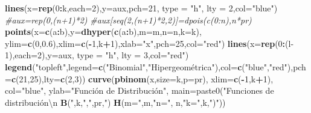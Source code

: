 \documentclass[]{book}
\newenvironment{Shaded}{\begin{snugshade}}{\end{snugshade}}
\newcommand{\CommentTok}[1]{\textcolor[rgb]{0.56,0.35,0.01}{\textit{#1}}}
\newcommand{\DataTypeTok}[1]{\textcolor[rgb]{0.13,0.29,0.53}{#1}}
\newcommand{\DecValTok}[1]{\textcolor[rgb]{0.00,0.00,0.81}{#1}}
\newcommand{\FloatTok}[1]{\textcolor[rgb]{0.00,0.00,0.81}{#1}}
\newcommand{\KeywordTok}[1]{\textcolor[rgb]{0.13,0.29,0.53}{\textbf{#1}}}
\newcommand{\NormalTok}[1]{#1}
\newcommand{\OperatorTok}[1]{\textcolor[rgb]{0.81,0.36,0.00}{\textbf{#1}}}
\newcommand{\StringTok}[1]{\textcolor[rgb]{0.31,0.60,0.02}{#1}}
\begin{document}
\begin{Shaded}
\begin{Highlighting}[]
  \KeywordTok{lines}\NormalTok{(}\DataTypeTok{x=}\KeywordTok{rep}\NormalTok{(}\DecValTok{0}\OperatorTok{:}\NormalTok{k,}\DataTypeTok{each=}\DecValTok{2}\NormalTok{),}\DataTypeTok{y=}\NormalTok{aux,}\DataTypeTok{pch=}\DecValTok{21}\NormalTok{, }\DataTypeTok{type =} \StringTok{"h"}\NormalTok{, }\DataTypeTok{lty =} \DecValTok{2}\NormalTok{,}\DataTypeTok{col=}\StringTok{"blue"}\NormalTok{)}
  \CommentTok{#aux=rep(0,(n+1)*2)}
  \CommentTok{#aux[seq(2,(n+1)*2,2)]=dpois(c(0:n),n*pr)}
  \KeywordTok{points}\NormalTok{(}\DataTypeTok{x=}\KeywordTok{c}\NormalTok{(a}\OperatorTok{:}\NormalTok{b),}\DataTypeTok{y=}\KeywordTok{dhyper}\NormalTok{(}\KeywordTok{c}\NormalTok{(a}\OperatorTok{:}\NormalTok{b),}\DataTypeTok{m=}\NormalTok{m,}\DataTypeTok{n=}\NormalTok{n,}\DataTypeTok{k=}\NormalTok{k),}
         \DataTypeTok{ylim=}\KeywordTok{c}\NormalTok{(}\DecValTok{0}\NormalTok{,}\FloatTok{0.6}\NormalTok{),}\DataTypeTok{xlim=}\KeywordTok{c}\NormalTok{(}\OperatorTok{-}\DecValTok{1}\NormalTok{,k}\OperatorTok{+}\DecValTok{1}\NormalTok{),}\DataTypeTok{xlab=}\StringTok{"x"}\NormalTok{,}\DataTypeTok{pch=}\DecValTok{25}\NormalTok{,}\DataTypeTok{col=}\StringTok{"red"}\NormalTok{)}
  \KeywordTok{lines}\NormalTok{(}\DataTypeTok{x=}\KeywordTok{rep}\NormalTok{(}\DecValTok{0}\OperatorTok{:}\NormalTok{(l}\DecValTok{-1}\NormalTok{),}\DataTypeTok{each=}\DecValTok{2}\NormalTok{),}\DataTypeTok{y=}\NormalTok{aux, }\DataTypeTok{type =} \StringTok{"h"}\NormalTok{, }\DataTypeTok{lty =} \DecValTok{3}\NormalTok{,}\DataTypeTok{col=}\StringTok{"red"}\NormalTok{)}
  \KeywordTok{legend}\NormalTok{(}\StringTok{"topleft"}\NormalTok{,}\DataTypeTok{legend=}\KeywordTok{c}\NormalTok{(}\StringTok{"Binomial"}\NormalTok{,}\StringTok{"Hipergeométrica"}\NormalTok{),}\DataTypeTok{col=}\KeywordTok{c}\NormalTok{(}\StringTok{"blue"}\NormalTok{,}\StringTok{"red"}\NormalTok{),}\DataTypeTok{pch=}\KeywordTok{c}\NormalTok{(}\DecValTok{21}\NormalTok{,}\DecValTok{25}\NormalTok{),}\DataTypeTok{lty=}\KeywordTok{c}\NormalTok{(}\DecValTok{2}\NormalTok{,}\DecValTok{3}\NormalTok{))}
  \KeywordTok{curve}\NormalTok{(}\KeywordTok{pbinom}\NormalTok{(x,}\DataTypeTok{size=}\NormalTok{k,}\DataTypeTok{p=}\NormalTok{pr),}
        \DataTypeTok{xlim=}\KeywordTok{c}\NormalTok{(}\OperatorTok{-}\DecValTok{1}\NormalTok{,k}\OperatorTok{+}\DecValTok{1}\NormalTok{), }\DataTypeTok{col=}\StringTok{"blue"}\NormalTok{, }\DataTypeTok{ylab=}\StringTok{"Función de Distribución",}
\StringTok{         main=paste0("}\NormalTok{Funciones de distribución\textbackslash{}n }\KeywordTok{B}\NormalTok{(}\StringTok{",k,"}\NormalTok{,}\StringTok{",pr,"}\NormalTok{) }\KeywordTok{H}\NormalTok{(}\DataTypeTok{m=}\StringTok{",m,"}\DataTypeTok{n=}\StringTok{", n,"}\DataTypeTok{k=}\StringTok{",k,"}\NormalTok{)}\StringTok{"))}

\end{Highlighting}
\end{Shaded}
\end{document}
